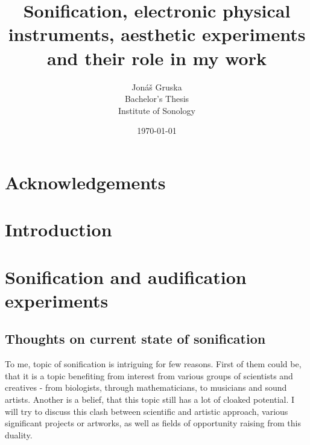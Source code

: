 \documentclass[11pt,a4paper,oneside]{report}
\begin{document}
\title{Sonification, electronic physical instruments, aesthetic experiments and their role in my work}
\author{Jonáš Gruska\\
				Bachelor's Thesis\\
				Institute of Sonology}
\date{\today}

\maketitle

\begin{abstract}
\end{abstract}

\chapter*{Acknowledgements}

\tableofcontents

\chapter{Introduction}

\chapter{Sonification and audification experiments}

\section{Thoughts on current state of sonification}
To me, topic of sonification is intriguing for few reasons. First of them could be, that it is a topic benefiting from interest from various groups of scientists and creatives - from biologists, through mathematicians, to musicians and sound artists. Another is a belief, that this topic still has a lot of cloaked potential. I will try to discuss this clash between scientific and artistic approach, various significant projects or artworks, as well as fields of opportunity raising from this duality.
\end{document}
